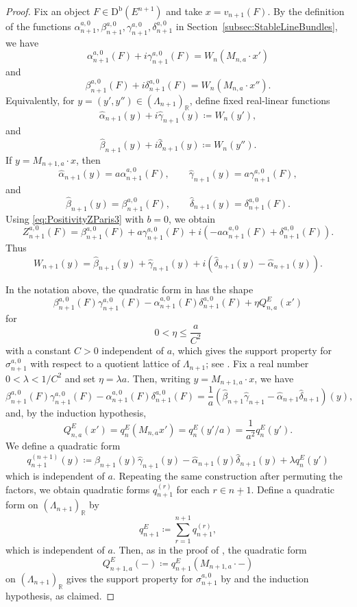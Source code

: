 \documentclass[11pt, reqno]{amsart}
\numberwithin{equation}{section}
\theoremstyle{plain}
\theoremstyle{remark}
\theoremstyle{definition}
\theoremstyle{italicsname}
\newcommand{\Db}{\mathrm{D^b}}
\def\RR{\ensuremath{\mathbb{R}}}
\begin{document}
\begin{proof}
Fix an object $F\in \Db(E^{n+1})$ and take $x= v_{n+1}(F)$. 
By the definition of the functions
$\alpha^{a,0}_{n+1},\beta^{a,0}_{n+1},\gamma^{a,0}_{n+1},\delta^{a,0}_{n+1}$ in Section~\ref{subsec:StableLineBundles}, we have
\[
\alpha^{a,0}_{n+1}(F)+i\gamma^{a,0}_{n+1}(F)=W_n(M_{n,a}\cdot x')
\]
and
\[
\beta^{a,0}_{n+1}(F)+i\delta^{a,0}_{n+1}(F)=W_n(M_{n,a}\cdot x'').
\]
Equivalently, for $y=(y',y'')\in(\Lambda_{n+1})_{\RR}$, define fixed
real-linear functions
\[
\widehat\alpha_{n+1}(y)+i\widehat\gamma_{n+1}(y)\coloneqq W_n(y'),
\]
and
\[
\widehat\beta_{n+1}(y)+i\widehat\delta_{n+1}(y)
\coloneqq W_n(y'').
\]
If $y=M_{n+1,a}\cdot x$, then
\[\widehat\alpha_{n+1}(y)=a\alpha^{a,0}_{n+1}(F),
\qquad
\widehat\gamma_{n+1}(y)=a\gamma^{a,0}_{n+1}(F),\]
and
\[\widehat\beta_{n+1}(y)=\beta^{a,0}_{n+1}(F),
\qquad
\widehat\delta_{n+1}(y)=\delta^{a,0}_{n+1}(F).\]
Using \eqref{eq:PositivityZParis3} with $b=0$, we obtain
\[
Z_{n+1}^{a,0}(F)=\beta^{a,0}_{n+1}(F)+a\gamma^{a,0}_{n+1}(F)
+i\left(-a\alpha^{a,0}_{n+1}(F)+\delta^{a,0}_{n+1}(F)\right).
\]
Thus
\[
W_{n+1}(y)=\widehat\beta_{n+1}(y)+\widehat\gamma_{n+1}(y)
+i\left(\widehat\delta_{n+1}(y)-\widehat\alpha_{n+1}(y)\right).
\]

In the notation above, the quadratic
form in \cite[Lemma 5.7]{Liu:StabProd} has the shape
\[
\beta^{a,0}_{n+1}(F)\gamma^{a,0}_{n+1}(F)-\alpha^{a,0}_{n+1}(F)\delta^{a,0}_{n+1}(F)+\eta Q^E_{n,a}(x')
\]
for 
\[
0< \eta\leq \frac{a}{C^2}
\]
with a constant $C>0$ independent of $a$, which gives the support property for $\sigma^{a,0}_{n+1}$ with respect to a quotient lattice of $\Lambda_{n+1}$; see \cite[Remark 5.8]{Liu:StabProd}. Fix a real number
$0<\lambda<1/C^2$ and set $\eta=\lambda a.$
Then, writing $y=M_{n+1,a}\cdot x$, we have
\[
\beta^{a,0}_{n+1}(F)\gamma^{a,0}_{n+1}(F)-\alpha^{a,0}_{n+1}(F)\delta^{a,0}_{n+1}(F)=\frac{1}{a}
\left(
\widehat\beta_{n+1}\widehat\gamma_{n+1}-\widehat\alpha_{n+1}\widehat\delta_{n+1}
\right)(y),
\]
and, by the induction hypothesis,
\[
Q^E_{n,a}(x')=q^E_n(M_{n,a}x')=q^E_n(y'/a)=\frac{1}{a^2}q^E_n(y').
\]
We define a quadratic form
\[
q^{(n+1)}_{n+1}(y)
\coloneqq
\widehat\beta_{n+1}(y)\widehat\gamma_{n+1}(y)-\widehat\alpha_{n+1}(y)\widehat\delta_{n+1}(y)+\lambda q^E_n(y')
\]
which is independent of $a$. Repeating the same construction after permuting the factors, we obtain
quadratic forms $q^{(r)}_{n+1}$ for each $r\in \underline{n+1}$. Define a quadratic form on $(\Lambda_{n+1})_{\RR}$ by
\[
q^E_{n+1}\coloneqq\sum_{r=1}^{n+1}q^{(r)}_{n+1},
\]
which is independent of $a$. Then, as in the proof of \cite[Theorem 4.5]{curves}, the quadratic form
\[
Q^E_{n+1,a}(-)\coloneqq q^E_{n+1}(M_{n+1,a}\cdot -)
\]
on $(\Lambda_{n+1})_{\RR}$ gives the support property for $\sigma_{n+1}^{a,0}$ by \cite[Lemma 7.5]{stab-E3} and the induction hypothesis, as claimed.
\end{proof}
\end{document}

